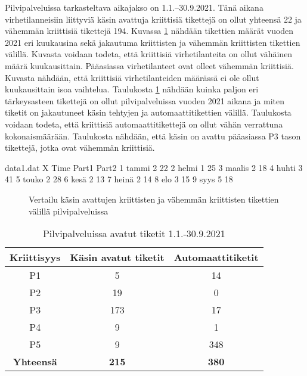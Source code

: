 Pilvipalveluissa tarkasteltava aikajakso on 1.1.--30.9.2021. Tänä aikana virhetilanneisiin liittyviä käsin avattuja kriittisiä tikettejä on ollut yhteensä 22 ja vähemmän kriittisiä tikettejä 194. Kuvassa \ref{fig:pilvitiketit} nähdään tikettien määrät vuoden 2021 eri kuukausina sekä jakautuma kriittisten ja vähemmän kriittisten tikettien välillä. Kuvasta voidaan todeta, että kriittisiä virhetilanteita on ollut vähäinen määrä kuukausittain. Pääasiassa virhetilanteet ovat olleet vähemmän kriittisiä. Kuvasta nähdään, että kriittisiä virhetilanteiden määrässä ei ole ollut kuukausittain isoa vaihtelua. Taulukosta \ref{table:pilviautomaatti} nähdään kuinka paljon eri tärkeysasteen tikettejä on ollut pilvipalveluissa vuoden 2021 aikana ja miten tiketit on jakautuneet käsin tehtyjen ja automaattitikettien välillä. Taulukosta voidaan todeta, että kriittisiä automaattitikettejä on ollut vähän verrattuna kokonaismäärään. Taulukosta nähdään, että käsin on avattu pääasiassa P3 tason tikettejä, jotka ovat vähemmän kriittisiä.

\begin{filecontents}{data1.dat}
X Time  	Part1  Part2
1 tammi  	2	    22
2 helmi		1	    25
3 maalis	2	    18
4 huhti		3	    41
5 touko		2	    28
6 kesä		2	    13
7 heinä		2	    14
8 elo       3       15
9 syys      5       18
\end{filecontents}

\begin{figure}[ht]
\caption{Vertailu käsin avattujen kriittisten ja vähemmän kriittisten tikettien välillä pilvipalveluissa}
\label{fig:pilvitiketit}
\end{figure}

\begin{table}[ht]
\centering
\begin{tabular}{||c c c||} 
 \hline
 Kriittisyys & Käsin avatut tiketit & Automaattitiketit \\ [0.5ex] 
 \hline\hline
 P1 & 5 & 14 \\ 
 P2 & 19 & 0 \\
 P3 & 173 & 17 \\
 P4 & 9 & 1 \\
 P5 & 9 & 348 \\
 \textbf{Yhteensä} & \textbf{215} & \textbf{380}\\ [1ex] 
 \hline
\end{tabular}
\caption{Pilvipalveluissa avatut tiketit 1.1.-30.9.2021}
\label{table:pilviautomaatti}
\end{table}

